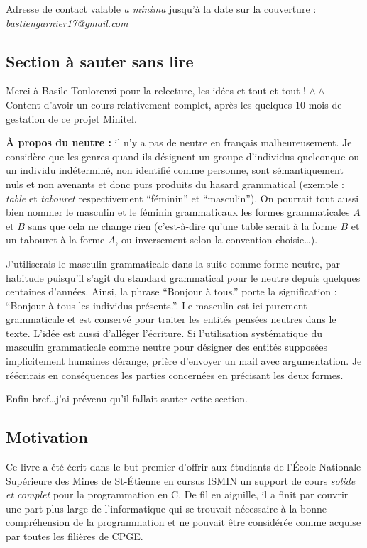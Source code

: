 \documentclass[../main.tex]{subfiles}
\begin{document}
Adresse de contact valable \textit{a minima} jusqu'à la date sur la couverture : \textit{bastiengarnier17@gmail.com}
\subsection*{Section à sauter sans lire}
Merci à Basile Tonlorenzi pour la relecture, les idées et tout et tout ! $\wedge\wedge$ Content d'avoir un cours relativement complet, après les quelques 10 mois de gestation de ce projet Minitel.

\textbf{À propos du neutre :} il n'y a pas de neutre en français malheureusement. Je considère que les genres quand ils désignent un groupe d'individus quelconque ou un individu indéterminé, non identifié comme personne, sont sémantiquement nuls et non avenants et donc purs produits du hasard grammatical (exemple : \textit{table} et \textit{tabouret} respectivement ``féminin'' et ``masculin''). On pourrait tout aussi bien nommer le masculin et le féminin grammaticaux les formes grammaticales $A$ et $B$ sans que cela ne change rien (c'est-à-dire qu'une table serait à la forme $B$ et un tabouret à la forme $A$, ou inversement selon la convention choisie\dots).

J'utiliserais le masculin grammaticale dans la suite comme forme neutre, par habitude puisqu'il s'agit du standard grammatical pour le neutre depuis quelques centaines d'années. Ainsi, la phrase ``Bonjour à tous.'' porte la signification : ``Bonjour à tous les individus présents.''. Le masculin est ici purement grammaticale et est conservé pour traiter les entités pensées neutres dans le texte. L'idée est aussi d'alléger l'écriture. Si l'utilisation systématique du masculin grammaticale comme neutre pour désigner des entités supposées implicitement humaines dérange, prière d'envoyer un mail avec argumentation. Je réécrirais en conséquences les parties concernées en précisant les deux formes.

Enfin bref\dots j'ai prévenu qu'il fallait sauter cette section.
\subsection*{Motivation}
Ce livre a été écrit dans le but premier d'offrir aux étudiants de l'École Nationale Supérieure des
Mines de St-Étienne en cursus ISMIN un support de cours \textit{solide et complet} pour la programmation en C. De fil
en aiguille, il a finit par couvrir une part plus large de l'informatique qui se trouvait nécessaire à la
bonne compréhension de la programmation et ne pouvait être considérée comme acquise par toutes les
filières de CPGE.
\end{document}
